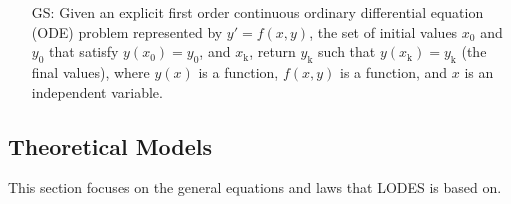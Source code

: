 \documentclass[12pt]{article}
\newcounter{goalnum} %
\newcommand{\famname}{LODES} %
\begin{document}
\begin{itemize}

\item[GS\refstepcounter{goalnum}\thegoalnum \label{G_SolveForY}:]{
Given an explicit first order continuous ordinary differential equation (ODE) problem
represented by $y'= f(x,y)$, the set of initial
values $x_\text{0}$ and $y_\text{0}$ that satisfy $y(x_\text{0}) = y_\text{0}$,
and $x_\text{k}$, return $y_\text{k}$ such that $y(x_\text{k}) = y_\text{k}$ (the final
values), where $y(x)$ is a function, $f(x,y)$ is a function, and $x$
is an independent variable.}


\end{itemize}

\subsection{Theoretical Models} \label{sec_theoretical}

This section focuses on the general equations and laws that \famname{} is based
on.

~\newline
\end{document}
